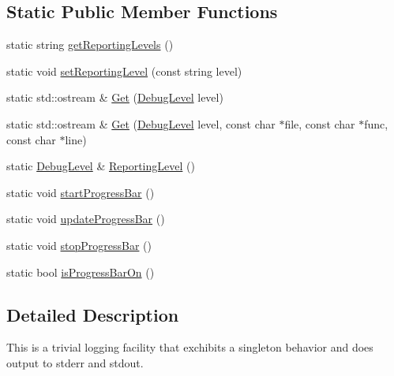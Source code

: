 \subsection*{Static Public Member Functions}
\begin{DoxyCompactItemize}
\item 
static string \hyperlink{classuva_1_1smt_1_1logging_1_1_logger_a21c762988e07657298e025a4df2813e3}{get\+Reporting\+Levels} ()
\item 
static void \hyperlink{classuva_1_1smt_1_1logging_1_1_logger_af07617f0088beaf25775c94202144548}{set\+Reporting\+Level} (const string level)
\item 
static std\+::ostream \& \hyperlink{classuva_1_1smt_1_1logging_1_1_logger_a645d1622809b356ec5863d31666fd6fd}{Get} (\hyperlink{classuva_1_1smt_1_1logging_1_1_logger_ad8a08f17c873112b1717d5fadbfe32d1}{Debug\+Level} level)
\item 
static std\+::ostream \& \hyperlink{classuva_1_1smt_1_1logging_1_1_logger_a9e52f2be59d5ba40107135b313ea1acb}{Get} (\hyperlink{classuva_1_1smt_1_1logging_1_1_logger_ad8a08f17c873112b1717d5fadbfe32d1}{Debug\+Level} level, const char $\ast$file, const char $\ast$func, const char $\ast$line)
\item 
static \hyperlink{classuva_1_1smt_1_1logging_1_1_logger_ad8a08f17c873112b1717d5fadbfe32d1}{Debug\+Level} \& \hyperlink{classuva_1_1smt_1_1logging_1_1_logger_a48dbb0863fed63eab9ca2fc50d86bb2a}{Reporting\+Level} ()
\item 
static void \hyperlink{classuva_1_1smt_1_1logging_1_1_logger_a93e0d1e9874895360ba8a5019819a253}{start\+Progress\+Bar} ()
\item 
static void \hyperlink{classuva_1_1smt_1_1logging_1_1_logger_ac99950b42d9cbe17becae3a68f4b0015}{update\+Progress\+Bar} ()
\item 
static void \hyperlink{classuva_1_1smt_1_1logging_1_1_logger_ae71f997a95aed7402dbad289f7a0ec9f}{stop\+Progress\+Bar} ()
\item 
static bool \hyperlink{classuva_1_1smt_1_1logging_1_1_logger_adc05eba04bec4f3c46414aa6e0dd8610}{is\+Progress\+Bar\+On} ()
\end{DoxyCompactItemize}


\subsection{Detailed Description}
This is a trivial logging facility that exchibits a singleton behavior and does output to stderr and stdout. 

